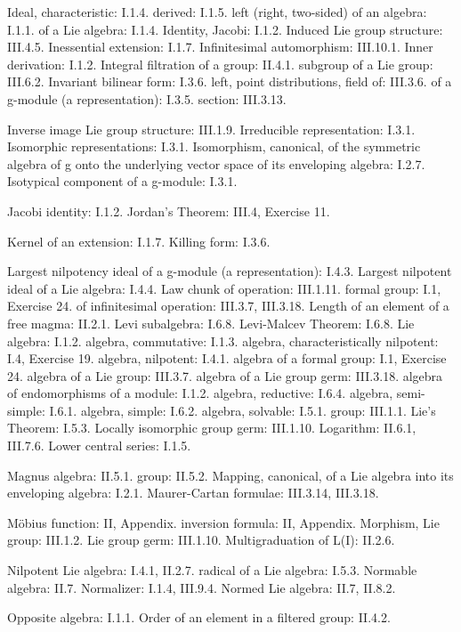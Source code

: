 Ideal, characteristic: I.1.4. derived: I.1.5. left (right, two-sided) of an algebra: I.1.1. of a Lie algebra: I.1.4. Identity, Jacobi: I.1.2. Induced Lie group structure: III.4.5. Inessential extension: I.1.7. Infinitesimal automorphism: III.10.1. Inner derivation: I.1.2. Integral filtration of a group: II.4.1. subgroup of a Lie group: III.6.2. Invariant bilinear form: I.3.6. left, point distributions, field of: III.3.6. of a g-module (a representation): I.3.5. section: III.3.13.

Inverse image Lie group structure: III.1.9. Irreducible representation: I.3.1. Isomorphic representations: I.3.1. Isomorphism, canonical, of the symmetric algebra of g onto the underlying vector space of its enveloping algebra: I.2.7. Isotypical component of a g-module: I.3.1.

Jacobi identity: I.1.2. Jordan's Theorem: III.4, Exercise 11.

Kernel of an extension: I.1.7. Killing form: I.3.6.

Largest nilpotency ideal of a g-module (a representation): I.4.3. Largest nilpotent ideal of a Lie algebra: I.4.4. Law chunk of operation: III.1.11. formal group: I.1, Exercise 24. of infinitesimal operation: III.3.7, III.3.18. Length of an element of a free magma: II.2.1. Levi subalgebra: I.6.8. Levi-Malcev Theorem: I.6.8. Lie algebra: I.1.2. algebra, commutative: I.1.3. algebra, characteristically nilpotent: I.4, Exercise 19. algebra, nilpotent: I.4.1. algebra of a formal group: I.1, Exercise 24. algebra of a Lie group: III.3.7. algebra of a Lie group germ: III.3.18. algebra of endomorphisms of a module: I.1.2. algebra, reductive: I.6.4. algebra, semi-simple: I.6.1. algebra, simple: I.6.2. algebra, solvable: I.5.1. group: III.1.1. Lie's Theorem: I.5.3. Locally isomorphic group germ: III.1.10. Logarithm: II.6.1, III.7.6. Lower central series: I.1.5.

Magnus algebra: II.5.1. group: II.5.2. Mapping, canonical, of a Lie algebra into its enveloping algebra: I.2.1. Maurer-Cartan formulae: III.3.14, III.3.18.

Möbius function: II, Appendix. inversion formula: II, Appendix. Morphism, Lie group: III.1.2. Lie group germ: III.1.10. Multigraduation of L(I): II.2.6.

Nilpotent Lie algebra: I.4.1, II.2.7. radical of a Lie algebra: I.5.3. Normable algebra: II.7. Normalizer: I.1.4, III.9.4. Normed Lie algebra: II.7, II.8.2.

Opposite algebra: I.1.1. Order of an element in a filtered group: II.4.2.

